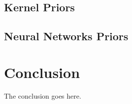 \documentclass[journal, onecolumn, 10pt]{IEEEtran}
\begin{document}
\subsection{Kernel Priors}

\subsection{Neural Networks Priors}

\section{Conclusion}
The conclusion goes here.



\ifCLASSOPTIONcaptionsoff
  \newpage
\fi






\end{document}
